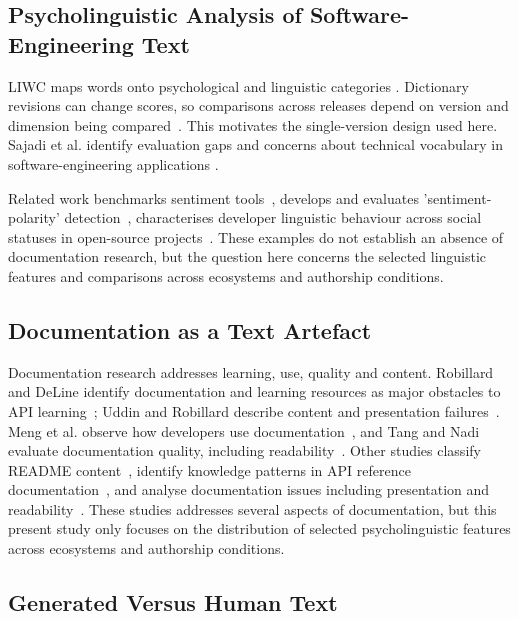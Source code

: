 \documentclass[conference]{IEEEtran}
\begin{document}
\subsection{Psycholinguistic Analysis of Software-Engineering Text}

LIWC maps words onto psychological and linguistic categories \cite{tausczik2010,boyd2022}. Dictionary revisions can change scores, so comparisons across releases depend on version and dimension being compared~\cite{pennebaker2015,boyd2022}. This motivates the single-version design used here. Sajadi et al. identify evaluation gaps and concerns about technical vocabulary in software-engineering applications
\cite{sajadi2026}.

Related work benchmarks sentiment tools~\cite{novielli2018}, develops and evaluates 'sentiment-polarity' detection~\cite{calefato2018}, characterises developer linguistic behaviour across social statuses in open-source projects~\cite{han2024}. These examples do not establish an absence of documentation research, but the question here concerns the selected linguistic features and comparisons across ecosystems and authorship conditions.

\subsection{Documentation as a Text Artefact}

Documentation research addresses learning, use, quality and content. Robillard and DeLine identify documentation and learning resources as major obstacles to API learning~\cite{robillard2011}; Uddin and Robillard describe content and presentation failures~\cite{uddin2015}. Meng et al. observe how developers use documentation~\cite{meng2019}, and Tang and Nadi evaluate documentation quality, including readability~\cite{tang2023}. Other studies classify README content~\cite{prana2019}, identify knowledge patterns in API reference documentation~\cite{maalej2013}, and analyse documentation issues including presentation and readability~\cite{aghajani2019}. These studies addresses several aspects of documentation, but this present study only focuses on the distribution of selected psycholinguistic features across ecosystems and authorship conditions.

\subsection{Generated Versus Human Text}
\end{document}
